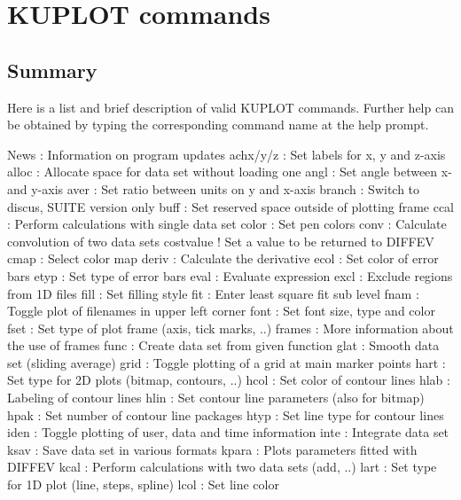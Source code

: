 \chapter{KUPLOT commands}
\section{Summary}
\par
Here is a list and brief description of valid KUPLOT commands. Further 
help can be obtained by typing the corresponding command name at the 
help prompt. 
\par
\begin{MacVerbatim}
News          : Information on program updates
achx/y/z      : Set labels for x, y and z-axis
alloc         : Allocate space for data set without loading one
angl          : Set angle between x- and y-axis
aver          : Set ratio between units on y and x-axis
branch        : Switch to discus, SUITE version only
buff          : Set reserved space outside of plotting frame
ccal          : Perform calculations with single data set
color         : Set pen colors
conv          : Calculate convolution of two data sets
costvalue     ! Set a value to be returned to DIFFEV
cmap          : Select color map
deriv         : Calculate the derivative
ecol          : Set color of error bars
etyp          : Set type of error bars
eval          : Evaluate expression
excl          : Exclude regions from 1D files
fill          : Set filling style
fit           : Enter least square fit sub level
fnam          : Toggle plot of filenames in upper left corner
font          : Set font size, type and color
fset          : Set type of plot frame (axis, tick marks, ..)
frames        : More information about the use of frames
func          : Create data set from given function
glat          : Smooth data set (sliding average)
grid          : Toggle plotting of a grid at main marker points
hart          : Set type for 2D plots (bitmap, contours, ..)
hcol          : Set color of contour lines
hlab          : Labeling of contour lines
hlin          : Set contour line parameters (also for bitmap)
hpak          : Set number of contour line packages
htyp          : Set line type for contour lines
iden          : Toggle plotting of user, data and time information
inte          : Integrate data set
ksav          : Save data set in various formats
kpara         : Plots parameters fitted with DIFFEV
kcal          : Perform calculations with two data sets (add, ..)
lart          : Set type for 1D plot (line, steps, spline)
lcol          : Set line color

\end{MacVerbatim}

